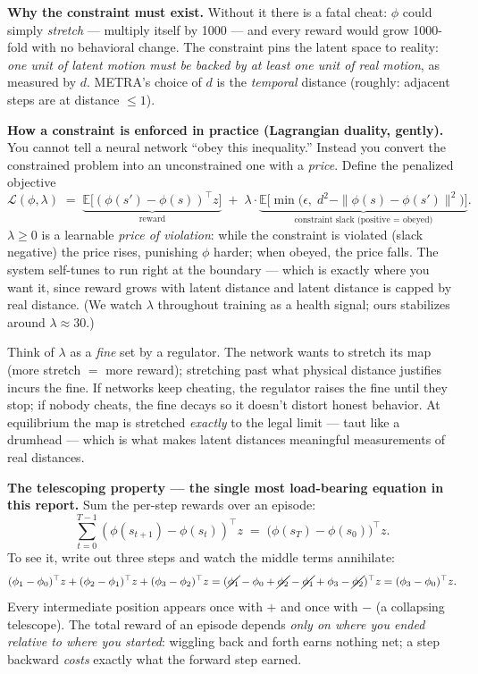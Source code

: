 \documentclass[11pt,a4paper]{article}
\begin{document}
\textbf{Why the constraint must exist.} Without it there is a fatal cheat:
$\phi$ could simply \emph{stretch} --- multiply itself by 1000 --- and every
reward would grow 1000-fold with no behavioral change. The constraint pins the
latent space to reality: \emph{one unit of latent motion must be backed by at
least one unit of real motion}, as measured by $d$. METRA's choice of $d$ is the
\emph{temporal} distance (roughly: adjacent steps are at distance $\le 1$).

\textbf{How a constraint is enforced in practice (Lagrangian duality, gently).}
You cannot tell a neural network ``obey this inequality.'' Instead you convert
the constrained problem into an unconstrained one with a \emph{price}. Define
the penalized objective
\[
\mathcal{L}(\phi, \lambda) \;=\;
\underbrace{\mathbb{E}\big[(\phi(s')-\phi(s))^\top z\big]}_{\text{reward}}
\;+\; \lambda \cdot
\underbrace{\mathbb{E}\big[\min\big(\epsilon,\; d^2 - \|\phi(s)-\phi(s')\|^2\big)\big]}_{\text{constraint slack (positive = obeyed)}} .
\]
$\lambda \ge 0$ is a learnable \emph{price of violation}: while the constraint is
violated (slack negative) the price rises, punishing $\phi$ harder; when obeyed,
the price falls. The system self-tunes to run right at the boundary --- which is
exactly where you want it, since reward grows with latent distance and latent
distance is capped by real distance. (We watch $\lambda$ throughout training as
a health signal; ours stabilizes around $\lambda \approx 30$.)

\begin{intuition}
Think of $\lambda$ as a \emph{fine} set by a regulator. The network wants to
stretch its map (more stretch $=$ more reward); stretching past what physical
distance justifies incurs the fine. If networks keep cheating, the regulator
raises the fine until they stop; if nobody cheats, the fine decays so it doesn't
distort honest behavior. At equilibrium the map is stretched \emph{exactly} to
the legal limit --- taut like a drumhead --- which is what makes latent distances
meaningful measurements of real distances.
\end{intuition}

\textbf{The telescoping property --- the single most load-bearing equation in
this report.} Sum the per-step rewards over an episode:
\begin{equation}
\sum_{t=0}^{T-1} (\phi(s_{t+1}) - \phi(s_t))^{\!\top} z
\;=\; \big(\phi(s_T) - \phi(s_0)\big)^{\!\top} z .
\label{eq:telescope}
\end{equation}
To see it, write out three steps and watch the middle terms annihilate:
\[
(\phi_1 - \phi_0)^\top z + (\phi_2 - \phi_1)^\top z + (\phi_3 - \phi_2)^\top z
= (\cancel{\phi_1} - \phi_0 + \cancel{\phi_2} - \cancel{\phi_1} + \phi_3 - \cancel{\phi_2})^\top z
= (\phi_3 - \phi_0)^\top z .
\]
Every intermediate position appears once with $+$ and once with $-$ (a
collapsing telescope). The total reward of an episode depends \emph{only on
where you ended relative to where you started}: wiggling back and forth earns
nothing net; a step backward \emph{costs} exactly what the forward step earned.
\end{document}
